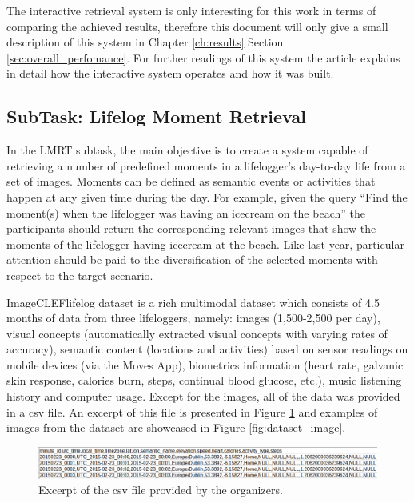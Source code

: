 The interactive retrieval system is only interesting for this work in terms of comparing the achieved results, therefore this document will only give a small description of this system in Chapter \ref{ch:results} Section \ref{sec:overall_perfomance}. For further readings of this system the article \cite{Ribeiro2020} explains in detail how the interactive system operates and how it was built.

    \subsection{SubTask: Lifelog Moment Retrieval}
    In the LMRT subtask, the main objective is to create a system capable of retrieving a number of predefined moments in a lifelogger’s day-to-day life from a set of images. Moments can be defined as semantic events or activities that happen at any given time during the day. For example, given the query “Find the moment(s) when the lifelogger was having an icecream on the beach” the participants should return the corresponding relevant images that show the moments of the lifelogger having icecream at the beach. Like last year, particular attention should be paid to the diversification of the selected moments with respect to the target scenario.

    ImageCLEFlifelog dataset is a rich multimodal dataset which consists of 4.5 months of data from three lifeloggers, namely: images (1,500-2,500 per day), visual concepts (automatically extracted visual concepts with varying rates of accuracy), semantic content (locations and activities) based on sensor readings on mobile devices (via the Moves App), biometrics information (heart rate, galvanic skin response, calories burn, steps, continual blood glucose, etc.), music listening history and computer usage. 
    Except for the images, all of the data was provided in a csv file. An excerpt of this file is presented in Figure \ref{fig:dataset_csv} and examples of images from the dataset are showcased in Figure \ref{fig:dataset_image}.

    \begin{figure}[htb]
        
        \centering
 
        \captionsetup{justification=centering}
        \includegraphics[width =  \textwidth]{Sections/5ImageClef/images/dataset.png}
        \caption[Provided csv file.]{Excerpt of the csv file provided by the organizers.}  
       \label{fig:dataset_csv}
    \end{figure}


